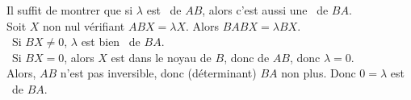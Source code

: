 Il suffit de montrer que si $\lambda$ est \valp\ de $AB$, alors c'est aussi une \valp\ de $BA$.\\
Soit $X$ non nul vérifiant $ABX = \lambda X$. Alors $BABX = \lambda BX$. \\
\bu\ Si $BX \neq 0$, $\lambda$ est bien \valp\ de $BA$.\\
\bu\ Si $BX = 0$, alors $X$ est dans le noyau de $B$, donc de $AB$, donc $\lambda = 0$.\\
Alors, $AB$ n'est pas inversible, donc (déterminant) $BA$ non plus. Donc $0=\lambda$ est \valp\ de $BA$.
